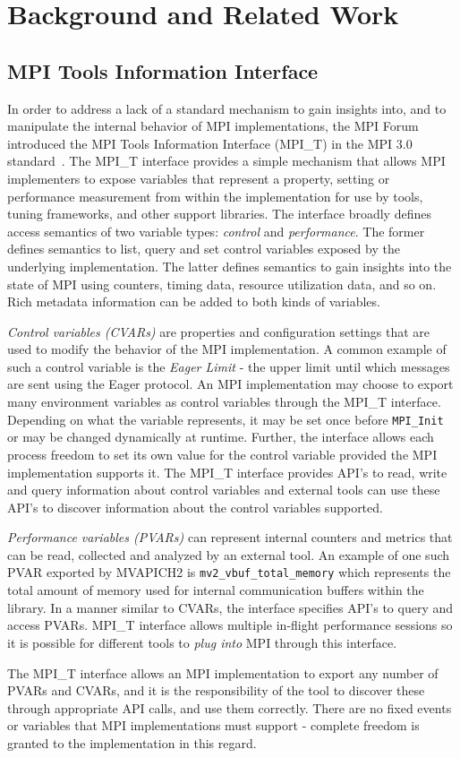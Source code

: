 \chapter{Background and Related Work}

\section{MPI Tools Information Interface}
In order to address a lack of a standard mechanism to gain insights into, and to manipulate the internal behavior of MPI implementations, the MPI Forum introduced the MPI Tools Information Interface (MPI\_T) in the MPI 3.0 standard~\cite{MPI_3_1}. The MPI\_T interface provides a simple mechanism that allows MPI implementers to expose variables that represent a property, setting or performance measurement from within the implementation for use by tools, tuning frameworks, and other support libraries. The interface broadly defines access semantics of two variable types: \textit{control} and \textit{performance}. The former defines semantics to list, query and set control variables exposed by the underlying implementation. The latter defines semantics to gain insights into the state of MPI using counters, timing data, resource utilization data, and so on. Rich metadata information can be added to both kinds of variables. \par
\textit{Control variables (CVARs)} are properties and configuration settings that are used to modify the behavior of the MPI implementation. A common example of such a control variable is the \emph{Eager Limit} - the upper limit until which messages are sent using the Eager protocol. An MPI implementation may choose to export many environment variables as control variables through the MPI\_T interface. Depending on what the variable represents, it may be set once before \verb+MPI_Init+ or may be changed dynamically at runtime. Further, the interface allows each process freedom to set its own value for the control variable provided the MPI implementation supports it. The MPI\_T interface provides API's to read, write and query information about control variables and external tools can use these API's to discover information about the control variables supported. \par
\textit{Performance variables (PVARs)} can represent internal counters and metrics that can be read, collected and analyzed by an external tool. An example of one such PVAR exported by MVAPICH2 is \verb+mv2_vbuf_total_memory+ which represents the total amount of memory used for internal communication buffers within the library. In a manner similar to CVARs, the interface specifies API's to query and access PVARs. MPI\_T interface allows multiple in-flight performance sessions so it is possible for different tools to \emph{plug into} MPI through this interface. \par
The MPI\_T interface allows an MPI implementation to export any number of PVARs and CVARs, and it is the responsibility of the tool to discover these through appropriate API calls, and use them correctly. There are no fixed events or variables that MPI implementations must support - complete freedom is granted to the implementation in this regard.


